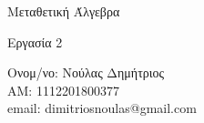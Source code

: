 \documentclass[oneside,a4paper]{article}
\newcommand {\tl}{\textlatin}
\begin{document}
	
	
	\begin{framed}	
		\begin{center}
			\huge Μεταθετική Άλγεβρα
		\end{center}
		\begin{center}
			\huge Εργασία 2
		\end{center}
		\vspace{0.3truecm}
		\begin{center}
			Ονομ/νο: Νούλας Δημήτριος\\
			ΑΜ: 1112201800377\\
			\tl{email}: \tl{dimitriosnoulas@gmail.com}
		\end{center}
		\vspace{0.3truecm}
	\end{framed}
	\vspace*{\fill}
	\begin{center}
	\end{center}
\vspace{1cm}
\pagebreak

\begin{center}
	\end{center}
\pagebreak
\end{document}
